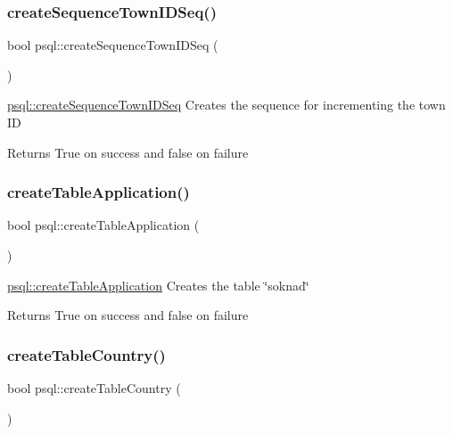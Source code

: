 \subsubsection{\texorpdfstring{createSequenceTownIDSeq()}{createSequenceTownIDSeq()}}
{\footnotesize\ttfamily bool psql\+::create\+Sequence\+Town\+I\+D\+Seq (\begin{DoxyParamCaption}{ }\end{DoxyParamCaption})}



\mbox{\hyperlink{classpsql_a6ce21cb5a1e77cb0c280e2932d2b557d}{psql\+::create\+Sequence\+Town\+I\+D\+Seq}} Creates the sequence for incrementing the town ID 

\begin{DoxyReturn}{Returns}
True on success and false on failure 
\end{DoxyReturn}
\mbox{\label{classpsql_a36f6a197a2214b9c71cfcd620334835d}} 
\subsubsection{\texorpdfstring{createTableApplication()}{createTableApplication()}}
{\footnotesize\ttfamily bool psql\+::create\+Table\+Application (\begin{DoxyParamCaption}{ }\end{DoxyParamCaption})}



\mbox{\hyperlink{classpsql_a36f6a197a2214b9c71cfcd620334835d}{psql\+::create\+Table\+Application}} Creates the table \char`\"{}soknad\char`\"{} 

\begin{DoxyReturn}{Returns}
True on success and false on failure 
\end{DoxyReturn}
\mbox{\label{classpsql_ab6e496d8471f3cd9c5c082a6ba75c25b}} 
\subsubsection{\texorpdfstring{createTableCountry()}{createTableCountry()}}
{\footnotesize\ttfamily bool psql\+::create\+Table\+Country (\begin{DoxyParamCaption}{ }\end{DoxyParamCaption})}



